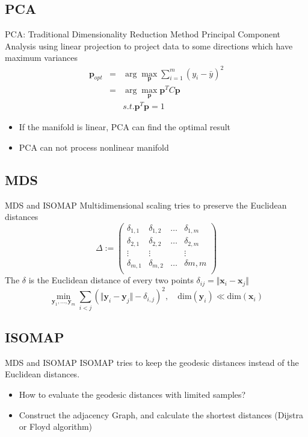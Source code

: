 \documentclass{beamer}
\newcommand{\bol}[1]{\textbf{#1}}
\begin{document}
\begin{darkframes}
    \subsection{PCA}
    \begin{frame}{PCA: Traditional Dimensionality Reduction Method}
    Principal Component Analysis using linear projection to project data to some directions which have maximum variances
  	\begin{eqnarray*}
  		\bol{p}_{opt} & = & \arg\max_{\bol{p}}\sum_{i = 1}^m(y_i - \bar{y})^2\\
  							& = & \arg\max_{\bol{p}}\bol{p}^TC\bol{p}\\
  							&    &  s.t. \bol{p}^T\bol{p} = 1
  	\end{eqnarray*}
  	\begin{itemize}
  		\item If the manifold is linear, PCA can find the optimal result
  		\item PCA can not process nonlinear manifold
  	\end{itemize}
    \end{frame}
    
    \subsection{MDS}
    \begin{frame}{MDS and ISOMAP}
    \alert{Multidimensional scaling} tries to preserve the Euclidean distances
    \begin{displaymath}
	\Delta :=
	\left( \begin{array}{cccc}
	\delta_{1,1} & \delta_{1,2} & \ldots & \delta_{1,m} \\
	\delta_{2,1} & \delta_{2,2} & \ldots & \delta_{2,m}\\
	\vdots & \vdots & &\vdots\\
	\delta_{m,1} & \delta_{m,2} &\ldots & \delta{m,m}\\
	\end{array} \right)
   \end{displaymath}
   The $\delta$ is the Euclidean distance of every two points $ \delta_{ij}=\Vert \textbf{x}_i - \textbf{x}_j \Vert$ 
   \[
     \min_{\textbf{y}_1,\ldots,\textbf{y}_m} \sum_{i<j}\left(\Vert \textbf{y}_i - \textbf{y}_j \Vert - 
     \delta_{i,j}\right)^2,\quad \textrm{dim}(\textbf{y}_i) \ll \textrm{dim}(\textbf{x}_i)
   \]
    \end{frame}
   
   
   \subsection{ISOMAP}
    \begin{frame}{MDS and ISOMAP}
     \alert{ISOMAP} tries to keep the geodesic distances instead of the Euclidean distances.
    \begin{itemize}
    	\item How to evaluate the geodesic distances with limited samples?
    	\item Construct the adjacency Graph, and calculate the shortest distances (Dijstra or Floyd algorithm)
    \end{itemize}
   	

\end{frame}
\end{darkframes}
\end{document}
